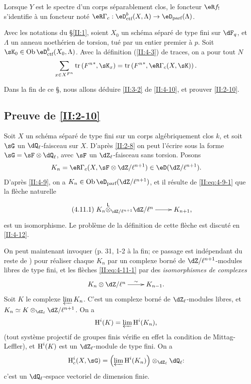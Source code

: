 Lorsque $Y$ est le spectre d'un corps séparablement clos, le foncteur $\eR f_!$ 
s'identifie à un foncteur noté 
$\eR \Gamma_c : \eD_\text{ctf}^b(X,\Lambda)\to\eD_\text{parf}(\Lambda)$. 





\begin{theorem_}\label{II:4-10}
Avec les notations du \S\ref{II:1}, soient $X_0$ un schéma séparé de type 
fini sur $\dF_q$, et $\Lambda$ un anneau noethérien de torsion, tué par un 
entier premier à $p$. Soit $\sK_0\in\ob\eD_\textnormal{ctf}^b(X_0,\Lambda)$. 
Avec la définition (\ref{II:4-3}) de traces, on a pour tout $N$ 
\begin{equation*}\label{II:eq:4-10}
  \sum_{x\in X^{F^n}} \tr\left({F^n}^*,\sK_x\right) = \tr\left({F^n}^*,\eR\Gamma_c(X,\sK)\right) \text{.}
\end{equation*}
\end{theorem_}

Dans la fin de ce \S, nous allons déduire \ref{II:3-2} de \ref{II:4-10}, et 
prouver \ref{II:2-10}. 





\subsection{Preuve de \texorpdfstring{\ref{II:2-10}}{2.10}}\label{II:4-11}

Soit $X$ un schéma séparé de type fini sur un corps algébriquement clos 
$k$, et soit $\sG$ un $\dQ_\ell$-faisceau sur $X$. D'après \ref{II:2-8} on 
peut l'écrire sous la forme $\sG=\sF\otimes\dQ_\ell$, avec $\sF$ un 
$\dZ_\ell$-faisceau sans torsion. Posons 
\[
  K_n = \eR \Gamma_c(X,\sF\otimes\dZ/\ell^{n+1})\in\eD(\dZ/\ell^{n+1}) \text{.}
\]
D'après \ref{II:4-9}, on a $K_n\in\ob\eD_\text{parf}(\dZ/\ell^{n+1})$, et il 
résulte de \eqref{II:eq:4-9-1} que la flèche naturelle 
\begin{equation*}\tag{4.11.1}\label{II:eq:4-11-1}
\xymatrix{
  K_n\lotimes_{\dZ/\ell^{n+1}} \dZ/\ell^n \ar[r] & K_{n+1} \text{,}
}
\end{equation*}
est un isomorphisme. Le problème de la définition de cette flèche est 
discuté en \ref{II:4-12}. 

On peut maintenant invoquer \cite[XI.3.3]{sga5} (p. 31, 1-2 à la fin; ce 
passage est indépendant du reste de \cite{sga5}) pour réaliser chaque 
$K_n$ par un complexe borné de $\dZ/\ell^{n+1}$-modules libres de type fini, 
et les flèches \eqref{II:eq:4-11-1} par des \emph{isomorphismes de complexes} 
\[\xymatrix{
  K_n\otimes \dZ/\ell^n \ar[r]^-\sim 
    & K_{n-1} \text{.}
}\]
Soit $K$ le complexe $\varprojlim K_n$. C'est un complexe borné de 
$\dZ_\ell$-modules libres, et $K_n\simeq K\otimes_{\dZ_\ell}\dZ/\ell^{n+1}$. On 
a 
\[
  \operatorname{H}^i(K) = \varprojlim \operatorname{H}^i(K_n) \text{,}
\]
(tout système projectif de groupes finis vérifie en effet la condition de 
Mittag-Leffler), et $\operatorname{H}^i(K)$ est un $\dZ_\ell$-module de type fini. On a 
\[
  \h_c^i(X,\sG) = \left(\varprojlim \h^i(K_n) \right)\otimes_{\dZ_\ell} \dQ_\ell \text{:}
\]
c'est un $\dQ_\ell$-espace vectoriel de dimension finie. 





